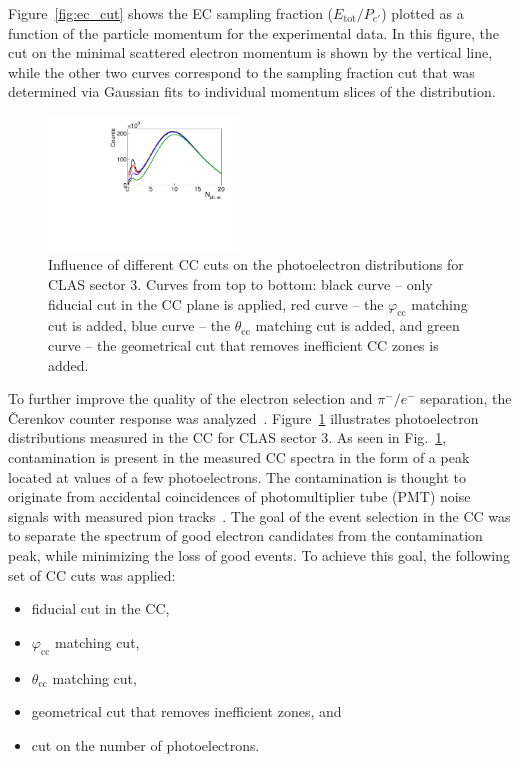 \documentclass[prc,twocolumn,superscriptaddress,showpacs,amssymb,amsmath,amsfonts,aps,nofootinbib]{revtex4-1}
\begin{document}
Figure~\ref{fig:ec_cut} shows the EC sampling fraction ($E_{\text{tot}}/P_{e'}$) plotted as a function of the particle momentum for the experimental data. In this figure, the cut on the minimal scattered electron momentum is shown by the vertical line, while the other two curves correspond to the sampling fraction cut that was determined via Gaussian fits to individual momentum slices of the distribution.


\begin{figure}[htp]
\begin{center}
 \includegraphics[width=0.45\textwidth,keepaspectratio]{pictures/event_selection/photoel.pdf}
\caption{Influence of different CC cuts on the photoelectron distributions for CLAS sector 3. Curves from top to bottom: black curve -- only fiducial cut in the CC plane is applied, red curve -- the $\varphi_{\text{cc}}$ matching cut is added, blue curve -- the $\theta_{\text{cc}}$ matching cut is added, and green curve -- the geometrical cut that removes inefficient CC zones is added.}
\label{fig:photoel}
\end{center}
\end{figure}


To further improve the quality of the electron selection and $\pi^{-}/e^{-}$ separation, the \v Cerenkov counter response was analyzed~\cite{Adams:2001kk}. Figure~\ref{fig:photoel} illustrates photoelectron distributions measured in the CC for CLAS sector 3.  As seen in Fig.\!~\ref{fig:photoel}, contamination is present in the measured CC spectra in the form of a peak located at values of a few photoelectrons. The contamination is thought to originate from accidental coincidences of photomultiplier tube (PMT) noise signals with measured pion tracks~\cite{Osipenko:2004}. The goal of the event selection in the CC was to separate the spectrum of good electron candidates from the contamination peak, while minimizing the loss of good events. To achieve this goal, the following set of CC cuts was applied: 

\begin{itemize}
\item fiducial cut in the CC,
\item $\varphi_{\text{cc}}$ matching cut,
\item $\theta_{\text{cc}}$ matching cut,
\item geometrical cut that removes inefficient zones, and
\item cut on the number of photoelectrons.
\end{itemize}
\end{document}

